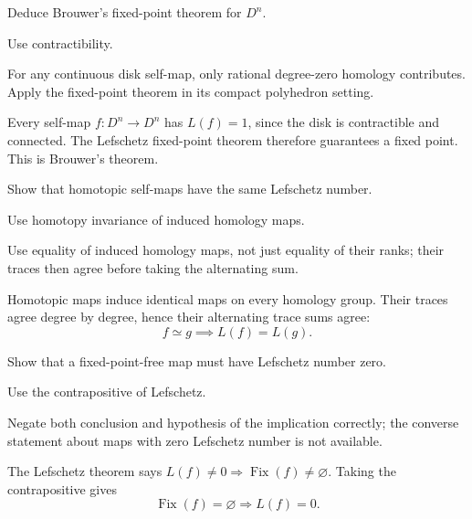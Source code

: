 \begin{exercise}\label{exr:viii35-06}
Deduce Brouwer's fixed-point theorem for $D^n$.
\end{exercise}
\begin{hint}
Use contractibility.

For any continuous disk self-map, only rational degree-zero homology contributes. Apply the fixed-point theorem in its compact polyhedron setting.
\end{hint}
\begin{solution}
Every self-map \(f:D^n\to D^n\) has \(L(f)=1\), since the disk is contractible and connected. The Lefschetz fixed-point theorem therefore guarantees a fixed point. This is Brouwer's theorem.
\end{solution}

\begin{exercise}\label{exr:viii35-07}
Show that homotopic self-maps have the same Lefschetz number.
\end{exercise}
\begin{hint}
Use homotopy invariance of induced homology maps.

Use equality of induced homology maps, not just equality of their ranks; their traces then agree before taking the alternating sum.
\end{hint}
\begin{solution}
Homotopic maps induce identical maps on every homology group. Their traces agree degree by degree, hence their alternating trace sums agree:
\[
f\simeq g\implies L(f)=L(g).
\]
\end{solution}

\begin{exercise}\label{exr:viii35-08}
Show that a fixed-point-free map must have Lefschetz number zero.
\end{exercise}
\begin{hint}
Use the contrapositive of Lefschetz.

Negate both conclusion and hypothesis of the implication correctly; the converse statement about maps with zero Lefschetz number is not available.
\end{hint}
\begin{solution}
The Lefschetz theorem says \(L(f)\ne0\Rightarrow\operatorname{Fix}(f)\ne\varnothing\). Taking the contrapositive gives
\[
\operatorname{Fix}(f)=\varnothing\Rightarrow L(f)=0.
\]
\end{solution}

